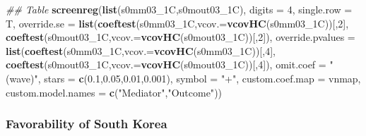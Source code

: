 \documentclass[
]{article}
\newenvironment{Shaded}{\begin{snugshade}}{\end{snugshade}}
\newcommand{\CommentTok}[1]{\textcolor[rgb]{0.56,0.35,0.01}{\textit{#1}}}
\newcommand{\DataTypeTok}[1]{\textcolor[rgb]{0.13,0.29,0.53}{#1}}
\newcommand{\DecValTok}[1]{\textcolor[rgb]{0.00,0.00,0.81}{#1}}
\newcommand{\FloatTok}[1]{\textcolor[rgb]{0.00,0.00,0.81}{#1}}
\newcommand{\KeywordTok}[1]{\textcolor[rgb]{0.13,0.29,0.53}{\textbf{#1}}}
\newcommand{\NormalTok}[1]{#1}
\newcommand{\StringTok}[1]{\textcolor[rgb]{0.31,0.60,0.02}{#1}}
\begin{document}
\begin{Shaded}
\begin{Highlighting}[]
\CommentTok{## Table}
\KeywordTok{screenreg}\NormalTok{(}\KeywordTok{list}\NormalTok{(s0mm03_1C,s0mout03_1C), }\DataTypeTok{digits =} \DecValTok{4}\NormalTok{, }\DataTypeTok{single.row =}\NormalTok{ T,}
          \DataTypeTok{override.se =} \KeywordTok{list}\NormalTok{(}\KeywordTok{coeftest}\NormalTok{(s0mm03_1C,}\DataTypeTok{vcov.=}\KeywordTok{vcovHC}\NormalTok{(s0mm03_1C))[,}\DecValTok{2}\NormalTok{],}
                             \KeywordTok{coeftest}\NormalTok{(s0mout03_1C,}\DataTypeTok{vcov.=}\KeywordTok{vcovHC}\NormalTok{(s0mout03_1C))[,}\DecValTok{2}\NormalTok{]),}
          \DataTypeTok{override.pvalues =} \KeywordTok{list}\NormalTok{(}\KeywordTok{coeftest}\NormalTok{(s0mm03_1C,}\DataTypeTok{vcov.=}\KeywordTok{vcovHC}\NormalTok{(s0mm03_1C))[,}\DecValTok{4}\NormalTok{],}
                                  \KeywordTok{coeftest}\NormalTok{(s0mout03_1C,}\DataTypeTok{vcov.=}\KeywordTok{vcovHC}\NormalTok{(s0mout03_1C))[,}\DecValTok{4}\NormalTok{]),}
          \DataTypeTok{omit.coef =} \StringTok{"(wave)"}\NormalTok{, }\DataTypeTok{stars =} \KeywordTok{c}\NormalTok{(}\FloatTok{0.1}\NormalTok{,}\FloatTok{0.05}\NormalTok{,}\FloatTok{0.01}\NormalTok{,}\FloatTok{0.001}\NormalTok{), }\DataTypeTok{symbol =} \StringTok{"+"}\NormalTok{,}
          \DataTypeTok{custom.coef.map =}\NormalTok{ vnmap, }
          \DataTypeTok{custom.model.names =} \KeywordTok{c}\NormalTok{(}\StringTok{"Mediator"}\NormalTok{,}\StringTok{"Outcome"}\NormalTok{))}
\end{Highlighting}
\end{Shaded}

\hypertarget{favorability-of-south-korea}{%
\subsubsection{Favorability of South
Korea}\label{favorability-of-south-korea}}
\end{document}
